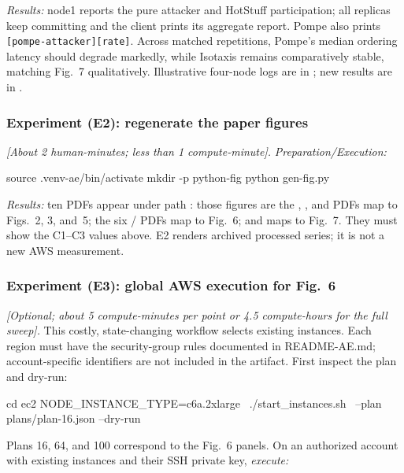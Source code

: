 \documentclass[conference]{IEEEtran}
\begin{document}
\textit{Results:} node1 reports the pure attacker and HotStuff participation;
all replicas keep committing and the client prints its aggregate report.  Pompe
also prints \texttt{[pompe-attacker][rate]}.  Across matched repetitions,
Pompe's median ordering latency should degrade markedly, while Isotaxis remains
comparatively stable, matching Fig.~7 qualitatively.  Illustrative four-node
logs are in ; new results are in .


\subsubsection{Experiment (E2): regenerate the paper figures}

\textit{[About 2 human-minutes; less than 1 compute-minute].}
\textit{Preparation/Execution:}

\begin{commandbox}
source .venv-ae/bin/activate
mkdir -p python-fig
python gen-fig.py
\end{commandbox}

\textit{Results:} ten PDFs appear under path : those figures are the
, , and  PDFs map to
Figs.~2, 3, and~5; the six / PDFs map to Fig.~6;
and  maps to Fig.~7.  They must show the C1--C3 values
above.  E2 renders archived processed series; it is not a new AWS measurement.

\subsubsection{Experiment (E3): global AWS execution for Fig.~6}

\textit{[Optional; about 5 compute-minutes per point or 4.5 compute-hours for
the full sweep].}  This costly, state-changing workflow selects existing
instances.
Each region must have the security-group rules documented in README-AE.md;
account-specific identifiers are not included in the artifact.
First inspect the plan and dry-run:

\begin{commandbox}
cd ec2
NODE_INSTANCE_TYPE=c6a.2xlarge \
  ./start_instances.sh \
  --plan plans/plan-16.json --dry-run
\end{commandbox}

Plans 16, 64, and 100 correspond to the Fig.~6 panels.  On an authorized
account with existing instances and their SSH private key, \textit{execute:}
\end{document}
